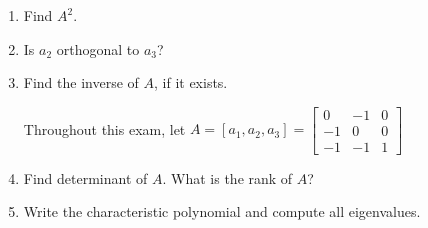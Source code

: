 \documentclass[11pt]{amsart}
\begin{document}
\begin{enumerate}



\item Find $A^2$.

\vspace{.5in}\vspace{.5in}


\item Is $a_2$ orthogonal to $a_3$?
\vspace{.5in}\vspace{.5in}




\item Find the inverse of $A$, if it exists.
\vspace{.5in}\vspace{.5in}
\vspace{.5in}\vspace{.5in}
\vspace{.5in}\vspace{.5in}



\newpage
Throughout this exam, let 
$A = [a_1, a_2, a_3] = 
\begin{bmatrix}
0 & -1 & 0\\
-1 & 0 & 0 \\
-1 & -1 & 1
\end{bmatrix}
$
\vspace{.2in}


\item Find determinant of $A$. What is the rank of $A$?
\vspace{.5in}\vspace{.5in}
\vspace{.5in}\vspace{.5in}










\item Write the characteristic polynomial and compute all eigenvalues.
\vspace{.5in}\vspace{.5in}
\vspace{.5in}\vspace{.5in}
\vspace{.5in}


\end{enumerate}
\end{document}
